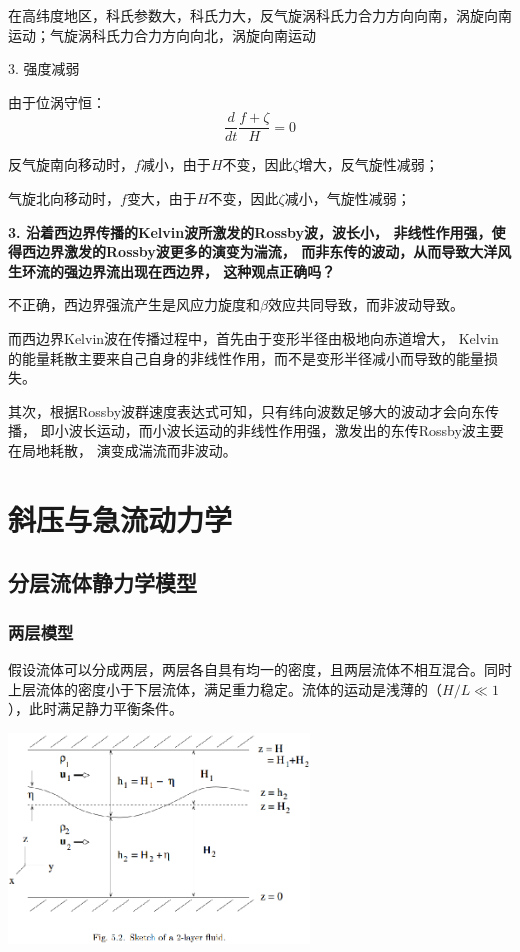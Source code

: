 \documentclass{article}
\begin{document}
在高纬度地区，科氏参数大，科氏力大，反气旋涡科氏力合力方向向南，涡旋向南运动；气旋涡科氏力合力方向向北，涡旋向南运动

3. 强度减弱

由于位涡守恒：
$$\frac{d}{dt}\frac{f+\zeta}{H}=0$$

反气旋南向移动时，$f$减小，由于$H$不变，因此$\zeta$增大，反气旋性减弱；

气旋北向移动时，$f$变大，由于$H$不变，因此$\zeta$减小，气旋性减弱；

\textbf{3. 沿着西边界传播的Kelvin波所激发的Rossby波，波长小，
非线性作用强，使得西边界激发的Rossby波更多的演变为湍流，
而非东传的波动，从而导致大洋风生环流的强边界流出现在西边界，
这种观点正确吗？}

不正确，西边界强流产生是风应力旋度和$\beta$效应共同导致，而非波动导致。

而西边界Kelvin波在传播过程中，首先由于变形半径由极地向赤道增大，
Kelvin的能量耗散主要来自己自身的非线性作用，而不是变形半径减小而导致的能量损失。

其次，根据Rossby波群速度表达式可知，只有纬向波数足够大的波动才会向东传播，
即小波长运动，而小波长运动的非线性作用强，激发出的东传Rossby波主要在局地耗散，
演变成湍流而非波动。

\newpage

\section{斜压与急流动力学}
\subsection{分层流体静力学模型}
\subsubsection{两层模型}
假设流体可以分成两层，两层各自具有均一的密度，且两层流体不相互混合。同时上层流体的密度小于下层流体，满足重力稳定。流体的运动是浅薄的（$H/L \ll 1$），此时满足静力平衡条件。

\begin{center}
\includegraphics[width=8cm]{Fig4_1.png}
\end{center}
\end{document}
